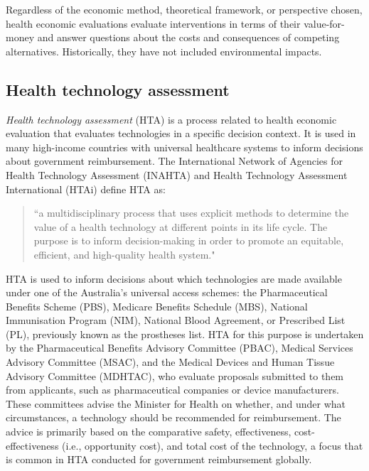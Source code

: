 \begin{refsection}
Regardless of the economic method, theoretical framework, or perspective chosen, health economic evaluations evaluate interventions in terms of their value-for-money and answer questions about the costs and consequences of competing alternatives. Historically, they have not included environmental impacts.

\subsection{Health technology assessment}
\textit{Health technology assessment} (HTA) is a process related to health economic evaluation that evaluates technologies in a specific decision context. It is used in many high-income countries with universal healthcare systems to inform decisions about government reimbursement. The International Network of Agencies for Health Technology Assessment (INAHTA) and Health Technology Assessment International (HTAi) define HTA as:
\begin{quote}
    ``a multidisciplinary process that uses explicit methods to determine the value of a health technology at different points in its life cycle. The purpose is to inform decision-making in order to promote an equitable, efficient, and high-quality health system."\cite{orourke_new_2020}
\end{quote}

HTA is used to inform decisions about which technologies are made available under one of the Australia’s universal access schemes: the Pharmaceutical Benefits Scheme (PBS), Medicare Benefits Schedule (MBS), National Immunisation Program (NIM), National Blood Agreement, or Prescribed List (PL), previously known as the prostheses list. HTA for this purpose is undertaken by the Pharmaceutical Benefits Advisory Committee (PBAC),\cite{australian_government_department_of_health_disability_and_ageing_guidelines_2016} Medical Services Advisory Committee (MSAC),\cite{australian_government_department_of_health_disability_and_ageing_guidelines_2021} and the Medical Devices and Human Tissue Advisory Committee (MDHTAC), who evaluate proposals submitted to them from applicants, such as pharmaceutical companies or device manufacturers. These committees advise the Minister for Health on whether, and under what circumstances, a technology should be recommended for reimbursement.\cite{australian_government_department_of_health_disability_and_ageing_guidelines_2016, australian_government_department_of_health_disability_and_ageing_guidelines_2021} The advice is primarily based on the comparative safety, effectiveness, cost-effectiveness (i.e., opportunity cost), and total cost of the technology, a focus that is common in HTA conducted for government reimbursement globally.\cite{world_health_organization_2015_2015}


\end{refsection}
